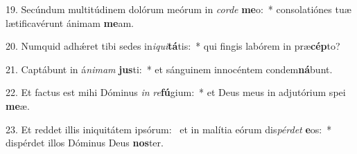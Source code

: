19. Secúndum multitúdinem dolórum meórum in \textit{cor}\textit{de} \textbf{me}o:~*  consolatiónes tuæ lætificavérunt ánimam \textbf{me}am.\

20. Numquid adhǽret tibi sedes in\textit{i}\textit{qui}\textbf{tá}tis:~*  qui fingis labórem in præ\textbf{cép}to?\

21. Captábunt in á\textit{ni}\textit{mam} \textbf{jus}ti:~*  et sánguinem innocéntem condem\textbf{ná}bunt.\

22. Et factus est mihi Dóminus \textit{in} \textit{re}\textbf{fú}gium:~*  et Deus meus in adjutórium spei \textbf{me}æ.\

23. Et reddet illis iniquitátem ipsórum: \dag\  et in malítia eórum dis\textit{pér}\textit{det} \textbf{e}os:~*  dispérdet illos Dóminus Deus \textbf{nos}ter.\

